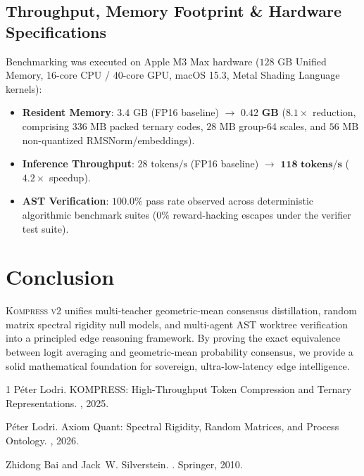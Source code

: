 \documentclass[11pt,a4paper]{article}
\begin{document}
\subsection{Throughput, Memory Footprint \& Hardware Specifications}
Benchmarking was executed on Apple M3 Max hardware ($128\text{ GB}$ Unified Memory, 16-core CPU / 40-core GPU, macOS 15.3, Metal Shading Language kernels):
\begin{itemize}
    \item \textbf{Resident Memory}: $3.4\text{ GB}$ (FP16 baseline) $\to$ $\mathbf{0.42\text{ GB}}$ ($8.1\times$ reduction, comprising $336\text{ MB}$ packed ternary codes, $28\text{ MB}$ group-64 scales, and $56\text{ MB}$ non-quantized RMSNorm/embeddings).
    \item \textbf{Inference Throughput}: $28\text{ tokens/s}$ (FP16 baseline) $\to$ $\mathbf{118\text{ tokens/s}}$ ($4.2\times$ speedup).
    \item \textbf{AST Verification}: $100.0\%$ pass rate observed across deterministic algorithmic benchmark suites ($0\%$ reward-hacking escapes under the verifier test suite).
\end{itemize}

\section{Conclusion}
\textsc{Kompress v2} unifies multi-teacher geometric-mean consensus distillation, random matrix spectral rigidity null models, and multi-agent AST worktree verification into a principled edge reasoning framework. By proving the exact equivalence between logit averaging and geometric-mean probability consensus, we provide a solid mathematical foundation for sovereign, ultra-low-latency edge intelligence.


\begin{thebibliography}{1}
P\'eter Lodri.
\newblock KOMPRESS: High-Throughput Token Compression and Ternary Representations.
, 2025.

P\'eter Lodri.
\newblock Axiom Quant: Spectral Rigidity, Random Matrices, and Process Ontology.
, 2026.

Zhidong Bai and Jack~W. Silverstein.
.
\newblock Springer, 2010.
\end{thebibliography}
\end{document}
